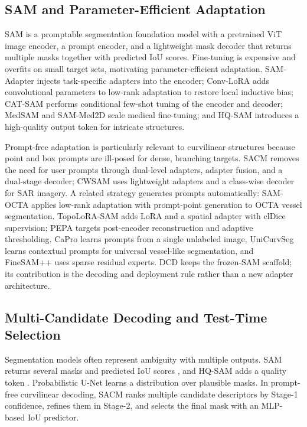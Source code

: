 \subsection{SAM and Parameter-Efficient Adaptation}
\label{sec:related_sam}

SAM \cite{kirillov2023sam} is a promptable segmentation foundation model with
a pretrained ViT image encoder, a prompt encoder, and a lightweight mask
decoder that returns multiple masks together with predicted IoU scores.
Fine-tuning is expensive and overfits on small target sets, motivating
parameter-efficient adaptation. SAM-Adapter
\cite{chen2023samadapter} injects task-specific adapters into the encoder;
Conv-LoRA \cite{zhong2024convlora} adds convolutional parameters to low-rank
adaptation to restore local inductive bias; CAT-SAM \cite{xiao2024catsam}
performs conditional few-shot tuning of the encoder and decoder; MedSAM
\cite{ma2024medsam} and SAM-Med2D \cite{cheng2023sammed2d} scale medical
fine-tuning; and HQ-SAM \cite{ke2023hqsam} introduces a high-quality output
token for intricate structures.

Prompt-free adaptation is particularly relevant to curvilinear structures
because point and box prompts are ill-posed for dense, branching targets.
SACM \cite{zhu2026sacm} removes the need for user prompts through dual-level
adapters, adapter fusion, and a dual-stage decoder; CWSAM \cite{pu2025cwsam}
uses lightweight adapters and a class-wise decoder for SAR imagery. A related strategy generates prompts automatically:
SAM-OCTA \cite{wang2024sam_octa} applies low-rank adaptation with prompt-point
generation to OCTA vessel segmentation. TopoLoRA-SAM
\cite{khazem2026topolorasam} adds LoRA and a spatial adapter with clDice
supervision; PEPA \cite{lei2026pepa} targets post-encoder reconstruction and
adaptive thresholding. CaPro \cite{chen2026capro} learns prompts from a single unlabeled
image, UniCurvSeg \cite{hu2025unicurvseg} learns contextual prompts for
universal vessel-like segmentation, and FineSAM++ \cite{jiang2025finesam} uses
sparse residual experts. DCD keeps the frozen-SAM scaffold; its contribution is
the decoding and deployment rule rather than a new adapter architecture.

\subsection{Multi-Candidate Decoding and Test-Time Selection}
\label{sec:related_selection}

Segmentation models often represent ambiguity with multiple outputs. SAM
returns several masks and predicted IoU scores \cite{kirillov2023sam}, and
HQ-SAM adds a quality token \cite{ke2023hqsam}. Probabilistic U-Net
\cite{kohl2018probunet} learns a distribution over plausible masks. In
prompt-free curvilinear decoding, SACM
\cite{zhu2026sacm} ranks multiple candidate descriptors by Stage-1
confidence, refines them in Stage-2, and selects the final mask with an
MLP-based IoU predictor.

